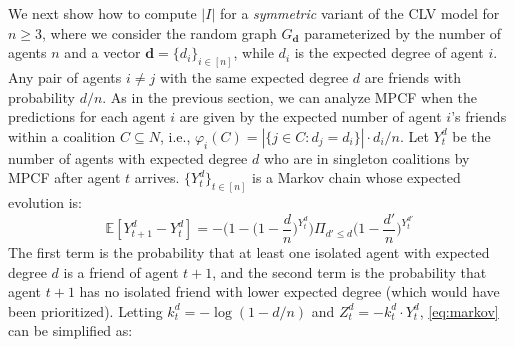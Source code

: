 \documentclass[letterpaper]{article} %
\begin{document}
We next show how to compute $|I|$ for a \textit{symmetric} variant of the CLV model for $n \geq 3$, where we consider the random graph $G_{\mathbf{d}}$ parameterized by the number of agents $n$ and a vector $\mathbf{d} = \{d_i\}_{i\in [n]}$, while $d_i$ is the expected degree of agent $i$. Any pair of agents $i\neq j$ with the same expected degree $d$ are friends with probability $d / n$. As in the previous section, we can analyze MPCF when the predictions for each agent $i$ are given by the expected number of agent $i$'s friends within a coalition $C \subseteq N$, i.e., $\varphi_i(C) = |\{j \in C: d_j = d_i\}| \cdot d_i /n$. %
%
Let $Y_t^d$ be the number of agents with expected degree $d$ who are in singleton coalitions by MPCF after agent $t$ arrives. %
$\{Y_t^d\}_{t\in [n]}$ is a Markov chain whose expected evolution is:
\begin{equation}
    \label{eq:markov}
    \mathbb{E}[Y_{t+1}^d-Y_t^d] = -\Big(1-\Big(1- \frac{d}{n}\Big)^{Y_t^d}\Big) \Pi_{d' \leq d} \Big(1- \frac{{d'}}{n}\Big)^{Y_t^{d'}}
\end{equation}
The first term is the probability that at least one isolated agent with expected degree $d$ is a friend of agent $t+1$, and the second term is the probability that agent $t+1$ has no isolated friend with lower expected degree (which would have been prioritized). Letting $k_t^d = -\log(1- d / n)$ and $Z_t^d = -k_t^d \cdot Y_{t}^d$, \eqref{eq:markov} can be simplified as:
\end{document}
